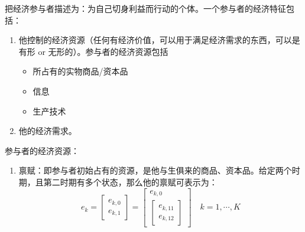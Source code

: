 \begin{tcolorbox}[knowledge,title=2.2 经济参与者]
    把经济参与者描述为：为自己切身利益而行动的个体。一个参与者的经济特征包括：
    \begin{enumerate}
        \item 他控制的经济资源（任何有经济价值，可以用于满足经济需求的东西，可以是有形 or 无形的）。参与者的经济资源包括
        \begin{itemize}
            \item 所占有的实物商品/资本品
            \item 信息
            \item 生产技术
        \end{itemize}
        \item 他的经济需求。
    \end{enumerate}

\tcbline

参与者的经济资源：
\begin{enumerate}
    \item 禀赋：即参与者初始占有的资源，是他与生俱来的商品、资本品。给定两个时期，且第二时期有多个状态，那么他的禀赋可表示为：
    \[
    e_k=\begin{bmatrix}e_{k,0} \\ e_{k,1}\end{bmatrix}
    =\begin{bmatrix}e_{k,0} \\ \begin{bmatrix}e_{k,11} \\ e_{k,12}\end{bmatrix}
    \end{bmatrix}
    \quad k=1,\cdots,K
    \]


\end{enumerate}
\end{tcolorbox}
